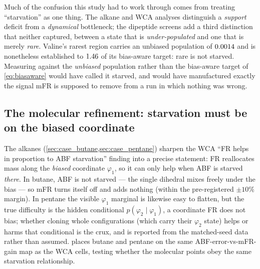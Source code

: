 \begin{remark}
\label{rem:starvation_kinds}
Much of the confusion this study had to work through comes from treating ``starvation'' as
one thing. The alkane and WCA analyses distinguish a \emph{support} deficit from a
\emph{dynamical} bottleneck; the dipeptide screens add a third distinction that neither
captured, between a state that is \emph{under-populated} and one that is merely
\emph{rare}. Valine's rarest region carries an unbiased population of $0.0014$ and is
nonetheless established to $1.46$ of its bias-aware target: rare is not starved.
Measuring against the \emph{unbiased} population rather than the bias-aware target of
\cref{eq:biasaware} would have called it starved, and would have manufactured exactly the
signal mFR is supposed to remove from a run in which nothing was wrong.
\end{remark}

\subsection{The molecular refinement: starvation must be on the biased coordinate}
The alkanes (\cref{sec:case_butane,sec:case_pentane}) sharpen the WCA ``FR helps in
proportion to ABF starvation'' finding into a precise statement:
FR reallocates mass along the \emph{biased} coordinate $\varphi_1$, so it can only
help when ABF is starved \emph{there}. In butane, ABF is not starved --- the single
dihedral mixes freely under the bias --- so mFR turns itself off and adds nothing
(within the pre-registered $\pm10\%$ margin). In pentane the visible $\varphi_1$
marginal is likewise easy to flatten, but the true difficulty is the hidden
conditional $p(\varphi_2\mid\varphi_1)$, a coordinate FR does not bias; whether
cloning whole configurations (which carry their $\varphi_2$ state) helps or harms
that conditional is the crux, and is reported from the matched-seed data rather than
assumed.  places butane and pentane on the same
ABF-error-vs-mFR-gain map as the WCA cells, testing whether the molecular points
obey the same starvation relationship.


